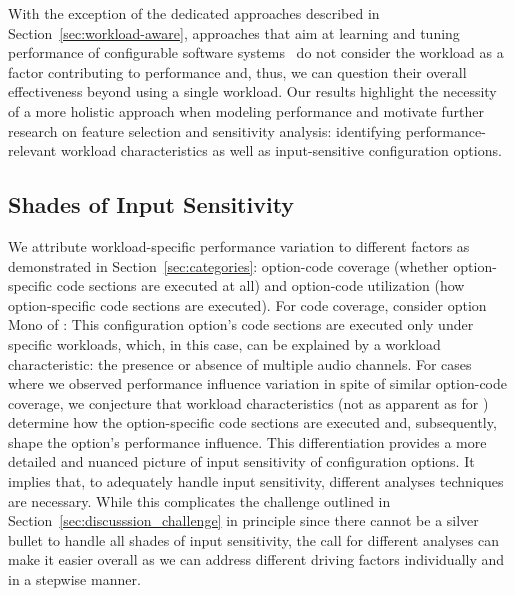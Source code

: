 With the exception of the dedicated approaches described in Section~\ref{sec:workload-aware}, approaches that aim at learning and tuning performance of configurable software systems~\cite{siegmundPerformanceinfluenceModelsHighly2015,haDeepPerf2019,perfAL,guoVariabilityawarePerformancePrediction2013,sarkarCostEfficientSamplingPerformance,guo_2018_data,fourier_learning_2015,perLasso} do not consider the workload as a factor contributing to performance and, thus, we can question their overall effectiveness beyond using a single workload. Our results highlight the necessity of a more holistic approach when modeling performance and motivate further research on feature selection and sensitivity analysis: identifying performance-relevant workload characteristics as well as input-sensitive configuration options.

\subsection{Shades of Input Sensitivity}

We attribute workload-specific performance variation to different factors as demonstrated in Section~\ref{sec:categories}: option-code coverage (whether option-specific code sections are executed at all) and option-code utilization (how option-specific code sections are executed). For code coverage, consider option \textsf{Mono} of \jumper: This configuration option's code sections are executed only under specific workloads, which, in this case, can be explained by a workload characteristic: the presence or absence of multiple audio channels. For cases where we observed performance influence variation in spite of similar option-code coverage, we conjecture that workload characteristics (not as apparent as for \jumper) determine how the option-specific code sections are executed and, subsequently, shape the option’s performance influence. 
This differentiation provides a more detailed and nuanced picture of input sensitivity of configuration options. It implies that, to adequately handle input sensitivity, different analyses techniques are necessary. While this complicates the challenge outlined in Section~\ref{sec:discusssion_challenge} in principle since there cannot be a silver bullet to handle all shades of input sensitivity, the call for different analyses can make it easier overall as we can address different driving factors individually and in a stepwise manner.

